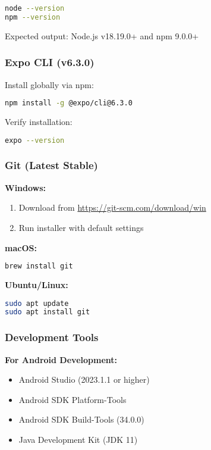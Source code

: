 \documentclass[11pt,a4paper]{article}
\begin{document}
\begin{lstlisting}[language=bash]
node --version
npm --version
\end{lstlisting}

Expected output: Node.js v18.19.0+ and npm 9.0.0+

\subsubsection{Expo CLI (v6.3.0)}

Install globally via npm:

\begin{lstlisting}[language=bash]
npm install -g @expo/cli@6.3.0
\end{lstlisting}

Verify installation:
\begin{lstlisting}[language=bash]
expo --version
\end{lstlisting}

\subsubsection{Git (Latest Stable)}

\textbf{Windows:}
\begin{enumerate}
    \item Download from \href{https://git-scm.com/download/win}{https://git-scm.com/download/win}
    \item Run installer with default settings
\end{enumerate}

\textbf{macOS:}
\begin{lstlisting}[language=bash]
brew install git
\end{lstlisting}

\textbf{Ubuntu/Linux:}
\begin{lstlisting}[language=bash]
sudo apt update
sudo apt install git
\end{lstlisting}

\subsubsection{Development Tools}

\textbf{For Android Development:}
\begin{itemize}
    \item Android Studio (2023.1.1 or higher)
    \item Android SDK Platform-Tools
    \item Android SDK Build-Tools (34.0.0)
    \item Java Development Kit (JDK 11)
\end{itemize}
\end{document}
